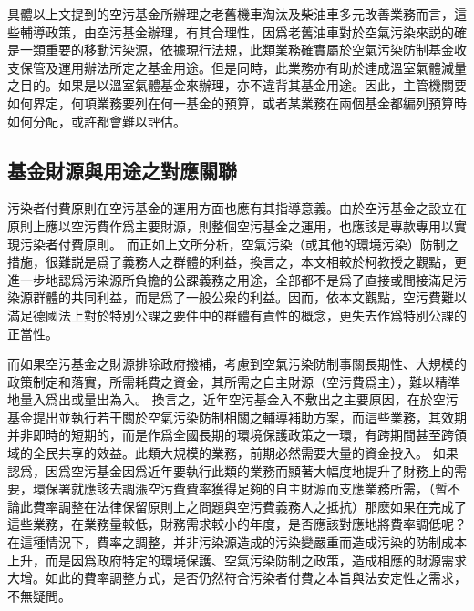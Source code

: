\documentclass[12pt,a4paper]{article}
\begin{document}
具體以上文提到的空污基金所辦理之老舊機車淘汰及柴油車多元改善業務而言，這些輔導政策，由空污基金辦理，有其合理性，因爲老舊油車對於空氣污染來説的確是一類重要的移動污染源，依據現行法規，此類業務確實屬於空氣污染防制基金收支保管及運用辦法所定之基金用途。但是同時，此業務亦有助於達成溫室氣體減量之目的。如果是以溫室氣體基金來辦理，亦不違背其基金用途。因此，主管機關要如何界定，何項業務要列在何一基金的預算，或者某業務在兩個基金都編列預算時如何分配，或許都會難以評估。

\subsection{基金財源與用途之對應關聯}

污染者付費原則在空污基金的運用方面也應有其指導意義。由於空污基金之設立在原則上應以空污費作爲主要財源，則整個空污基金之運用，也應該是專款專用以實現污染者付費原則。
而正如上文所分析，空氣污染（或其他的環境污染）防制之措施，很難説是爲了義務人之群體的利益，換言之，本文相較於柯教授之觀點，更進一步地認爲污染源所負擔的公課義務之用途，全部都不是爲了直接或間接滿足污染源群體的共同利益，而是爲了一般公衆的利益。因而，依本文觀點，空污費難以滿足德國法上對於特別公課之要件中的群體有責性的概念，更失去作爲特別公課的正當性。



而如果空污基金之財源排除政府撥補，考慮到空氣污染防制事關長期性、大規模的政策制定和落實，所需耗費之資金，其所需之自主財源（空污費爲主），難以精準地量入爲出或量出為入。
換言之，近年空污基金入不敷出之主要原因，在於空污基金提出並執行若干關於空氣污染防制相關之輔導補助方案，而這些業務，其效期并非即時的短期的，而是作爲全國長期的環境保護政策之一環，有跨期間甚至跨領域的全民共享的效益。此類大規模的業務，前期必然需要大量的資金投入。
如果認爲，因爲空污基金因爲近年要執行此類的業務而顯著大幅度地提升了財務上的需要，環保署就應該去調漲空污費費率獲得足夠的自主財源而支應業務所需，（暫不論此費率調整在法律保留原則上之問題與空污費義務人之抵抗）那麽如果在完成了這些業務，在業務量較低，財務需求較小的年度，是否應該對應地將費率調低呢？在這種情況下，費率之調整，并非污染源造成的污染變嚴重而造成污染的防制成本上升，而是因爲政府特定的環境保護、空氣污染防制之政策，造成相應的財源需求大增。如此的費率調整方式，是否仍然符合污染者付費之本旨與法安定性之需求，不無疑問。
\end{document}
